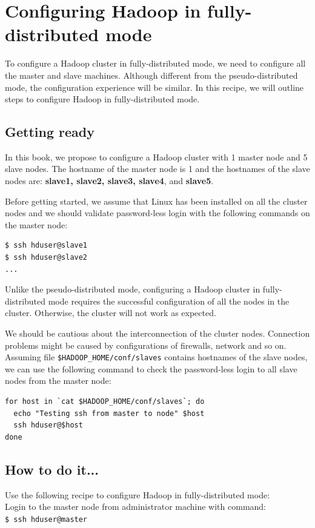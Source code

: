 \section{Configuring Hadoop in fully-distributed mode}
To configure a Hadoop cluster in fully-distributed mode, we need to configure all the master and slave machines. Although different from the pseudo-distributed mode, the configuration experience will be similar.  In this recipe, we will outline steps to configure Hadoop in fully-distributed mode.
\subsection*{Getting ready}
In this book, we propose to configure a Hadoop cluster with 1 master node and 5 slave nodes. The hostname of the master node is 1 and the hostnames of the slave nodes are: \textbf{slave1, slave2, slave3, slave4}, and \textbf{slave5}.

Before getting started, we assume that Linux has been installed on all the cluster nodes and we should validate password-less login with the following commands on the master node:
\lstset{style=bashstyle}
\begin{lstlisting}
$ ssh hduser@slave1
$ ssh hduser@slave2
...
\end{lstlisting}
Unlike the pseudo-distributed mode, configuring a Hadoop cluster in fully-distributed mode requires the successful configuration of all the nodes in the cluster. Otherwise, the cluster will not work as expected.

We should be cautious about the interconnection of the cluster nodes. Connection problems might be caused by configurations of firewalls, network and so on.
Assuming file \verb|$HADOOP_HOME/conf/slaves| contains hostnames of the slave nodes, we can use the following command to check the password-less login to all slave nodes from the master node: 
\lstset{style=bashstyle}
\begin{lstlisting}
for host in `cat $HADOOP_HOME/conf/slaves`; do
  echo "Testing ssh from master to node" $host
  ssh hduser@$host
done
\end{lstlisting}

\subsection*{How to do it...}
Use the following recipe to configure Hadoop in fully-distributed mode: \\
Login to the master node from administrator machine with command: \\
\verb|$ ssh hduser@master|


